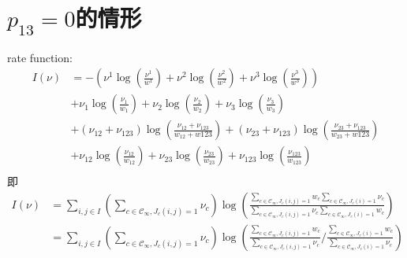 \documentclass[cn,hazy,egreen,14pt,normal]{elegantnote}
\begin{document}
\section{$p_{13}=0$的情形}
rate function:
\begin{align*}
    I(\nu)
    &= -(\nu^{1} \log (\frac{\nu^{1}}{w^{1}}) + \nu^{2} \log (\frac{\nu^{2}}{w^{2}}) + \nu^{3} \log (\frac{\nu^{3}}{w^{3}})) \\
    &+ \nu_{1} \log (\frac{\nu_{1}}{w_{1}}) + \nu_{2} \log (\frac{\nu_{2}}{w_{2}}) + \nu_{3} \log (\frac{\nu_{3}}{w_{3}}) \\
    &+ (\nu_{12}+\nu_{123}) \log(\frac{\nu_{12}+\nu_{123}}{w_{12}+w{123}}) +
    (\nu_{23}+\nu_{123}) \log(\frac{\nu_{23}+\nu_{123}}{w_{23}+w{123}}) \\
    &+ \nu_{12} \log(\frac{\nu_{12}}{w_{12}}) + \nu_{23} \log(\frac{\nu_{23}}{w_{23}}) + \nu_{123} \log(\frac{\nu_{123}}{w_{123}}) \\
\end{align*}
即
\begin{align*}
    I(\nu) &=  \sum_{i, j \in I} \left(\sum_{c \in \mathcal{C_{\infty}}, J_c(i, j)=1}
    \nu_c \right) \log(\frac{\sum_{c \in \mathcal{C_{\infty}}, J_c(i, j)=1} w_c \sum_{c \in \mathcal{C_{\infty}}, J_c(i)=1} \nu_c}{\sum_{c \in \mathcal{C_{\infty}}, J_c(i, j)=1} \nu_c \sum_{c \in \mathcal{C_{\infty}}, J_c(i)=1} w_c}) \\
    &= \sum_{i, j \in I} \left(\sum_{c \in \mathcal{C_{\infty}}, J_c(i, j)=1}
    \nu_c \right) \log(\frac{\sum_{c \in \mathcal{C_{\infty}}, J_c(i, j)=1} w_c }{\sum_{c \in \mathcal{C_{\infty}}, J_c(i, j)=1} \nu_c }
    /\frac{\sum_{c \in \mathcal{C_{\infty}}, J_c(i)=1} w_c}{\sum_{c \in \mathcal{C_{\infty}}, J_c(i)=1} \nu_c}) \\
\end{align*}
\end{document}
